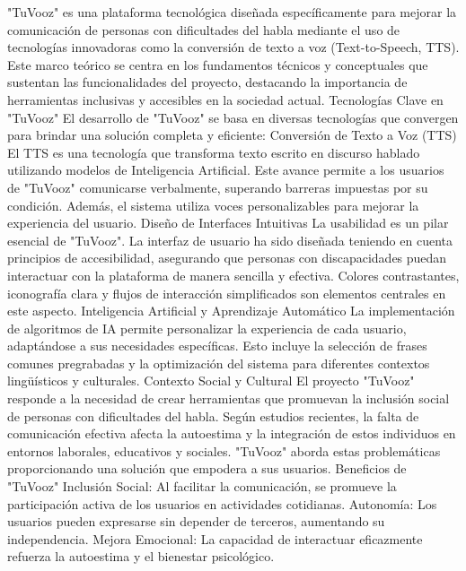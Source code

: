 \documentclass[12pt, a4paper, twocolumn]{article}
\begin{document}
"TuVooz" es una plataforma tecnológica diseñada específicamente para mejorar la comunicación de personas con dificultades del habla mediante el uso de tecnologías innovadoras como la conversión de texto a voz (Text-to-Speech, TTS). Este marco teórico se centra en los fundamentos técnicos y conceptuales que sustentan las funcionalidades del proyecto, destacando la importancia de herramientas inclusivas y accesibles en la sociedad actual.
Tecnologías Clave en "TuVooz"
El desarrollo de "TuVooz" se basa en diversas tecnologías que convergen para brindar una solución completa y eficiente:
Conversión de Texto a Voz (TTS)
El TTS es una tecnología que transforma texto escrito en discurso hablado utilizando modelos de Inteligencia Artificial. Este avance permite a los usuarios de "TuVooz" comunicarse verbalmente, superando barreras impuestas por su condición. Además, el sistema utiliza voces personalizables para mejorar la experiencia del usuario.
Diseño de Interfaces Intuitivas
La usabilidad es un pilar esencial de "TuVooz". La interfaz de usuario ha sido diseñada teniendo en cuenta principios de accesibilidad, asegurando que personas con discapacidades puedan interactuar con la plataforma de manera sencilla y efectiva. Colores contrastantes, iconografía clara y flujos de interacción simplificados son elementos centrales en este aspecto.
Inteligencia Artificial y Aprendizaje Automático
La implementación de algoritmos de IA permite personalizar la experiencia de cada usuario, adaptándose a sus necesidades específicas. Esto incluye la selección de frases comunes pregrabadas y la optimización del sistema para diferentes contextos lingüísticos y culturales.
Contexto Social y Cultural
El proyecto "TuVooz" responde a la necesidad de crear herramientas que promuevan la inclusión social de personas con dificultades del habla. Según estudios recientes, la falta de comunicación efectiva afecta la autoestima y la integración de estos individuos en entornos laborales, educativos y sociales. "TuVooz" aborda estas problemáticas proporcionando una solución que empodera a sus usuarios.
Beneficios de "TuVooz"
Inclusión Social: Al facilitar la comunicación, se promueve la participación activa de los usuarios en actividades cotidianas.
Autonomía: Los usuarios pueden expresarse sin depender de terceros, aumentando su independencia.
Mejora Emocional: La capacidad de interactuar eficazmente refuerza la autoestima y el bienestar psicológico.
\end{document}
